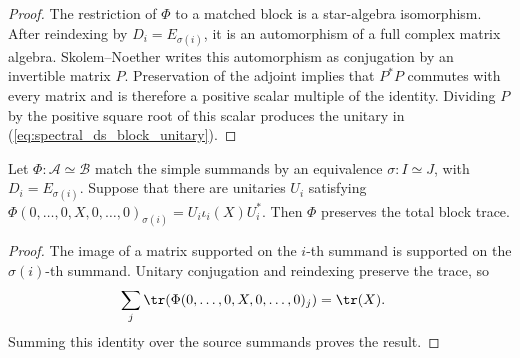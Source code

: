 \begin{proof}\leanok
    The restriction of $\Phi$ to a matched block is a star-algebra
    isomorphism. After reindexing by $D_i=E_{\sigma(i)}$, it is an
    automorphism of a full complex matrix algebra. Skolem--Noether writes
    this automorphism as conjugation by an invertible matrix $P$.
    Preservation of the adjoint implies that $P^*P$ commutes with every
    matrix and is therefore a positive scalar multiple of the identity.
    Dividing $P$ by the positive square root of this scalar produces the
    unitary in (\ref{eq:spectral_ds_block_unitary}).
\end{proof}

\begin{lemma}
    \label{lem:direct_sum_block_unitary_trace_preserving}
    \leanok
    Let $\Phi:\mathcal A\simeq\mathcal B$ match the simple summands by an
    equivalence $\sigma:I\simeq J$, with $D_i=E_{\sigma(i)}$. Suppose that
    there are unitaries $U_i$ satisfying
    $\Phi(0,\ldots,0,X,0,\ldots,0)_{\sigma(i)}
        =U_i\iota_i(X)U_i^*$.
    Then $\Phi$ preserves the total block trace.
\end{lemma}

\begin{proof}\leanok
    The image of a matrix supported on the $i$-th summand is supported on the
    $\sigma(i)$-th summand. Unitary conjugation and reindexing preserve the
    trace, so
    \begin{align}
        \sum_j\tr
        (\Phi(0,\ldots,0,X,0,\ldots,0)_j)
         & =\tr(X).
        \notag
    \end{align}
    Summing this identity over the source summands proves the result.
\end{proof}

